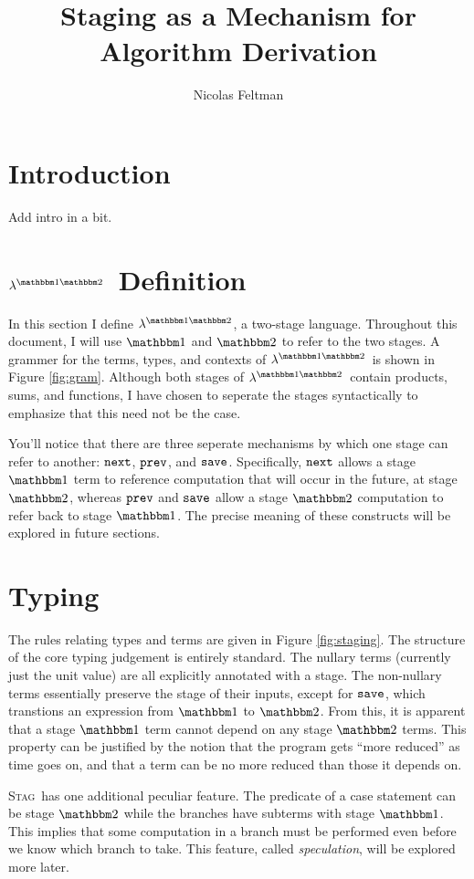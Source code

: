 \documentclass[11pt]{article}
\title{\Large\textbf{Staging as a Mechanism for Algorithm Derivation}}
\author{Nicolas Feltman}
\newcommand {\bbone} {\mathbbm 1}
\newcommand {\bbtwo} {\mathbbm 2}
\newcommand {\pause} {{\tt save}}
\newcommand {\next} {{\tt next}}
\newcommand {\prev} {{\tt prev}}
\newcommand {\lang} {$\lambda^{\bbone\bbtwo}$}
\newcommand {\wstage} {\textsc{Stag}}
\begin{document}
\maketitle

\section{Introduction}

Add intro in a bit.

\section{\lang~Definition}
\label{sec:def}

In this section I define \lang, a two-stage language.  Throughout this document, I will use $\bbone$ and $\bbtwo$ to refer to the two stages.  A grammer for the terms, types, and contexts of \lang\ is shown in Figure \ref{fig:gram}.  Although both stages of \lang\ contain products, sums, and functions, I have chosen to seperate the stages syntactically to emphasize that this need not be the case.

You'll notice that there are three seperate mechanisms by which one stage can refer to another: $\next$, $\prev$, and $\pause$.  Specifically, $\next$ allows a stage $\bbone$ term to reference computation that will occur in the future, at stage $\bbtwo$, whereas $\prev$ and $\pause$ allow a stage $\bbtwo$ computation to refer back to stage $\bbone$.  The precise meaning of these constructs will be explored in future sections.

\section{Typing}

The rules relating types and terms are given in Figure \ref{fig:staging}.  The structure of the core typing judgement is entirely standard.  The nullary terms (currently just the unit value) are all explicitly annotated with a stage.  The non-nullary terms essentially preserve the stage of their inputs, except for $\pause$, which transtions an expression from $\bbone$ to $\bbtwo$.  From this, it is apparent that a stage $\bbone$ term cannot depend on any stage $\bbtwo$ terms.  This property can be justified by the notion that the program gets ``more reduced'' as time goes on, and that a term can be no more reduced than those it depends on.

\wstage~has one additional peculiar feature.  The predicate of a case statement can be stage $\bbtwo$ while the branches have subterms with stage $\bbone$.  This implies that some computation in a branch must be performed even before we know which branch to take.  This feature, called {\it speculation}, will be explored more later.
\end{document}
